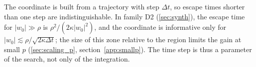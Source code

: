 The coordinate is built from a trajectory with step $\Delta t$, so escape times shorter than one step are indistinguishable. In family D2 (\cref{sec:synth}), the escape time for $|w_0|\gg\rho$ is $\rho^2/(2\kappa|w_0|^2)$, and the coordinate is informative only for $|w_0|\lesssim\rho/\sqrt{2\kappa\Delta t}$; the size of this zone relative to the region limits the gain at small $p$ (\cref{sec:scaling_p}, section~\ref{app:smallp}). The time step is thus a parameter of the search, not only of the integration.
